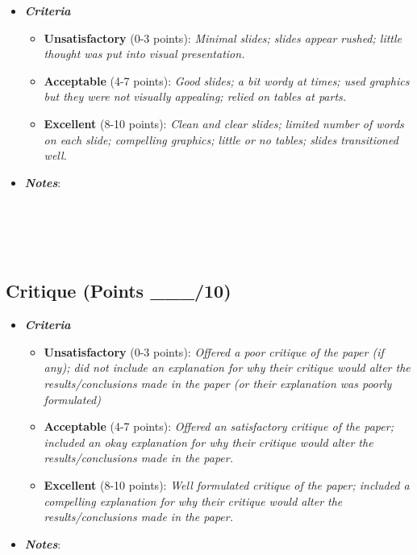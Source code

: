 \documentclass[
]{article}
\providecommand{\tightlist}{%
  \setlength{\itemsep}{0pt}\setlength{\parskip}{0pt}}
\begin{document}
\begin{itemize}
\tightlist
\item
  \textbf{\emph{Criteria}}

  \begin{itemize}
  \tightlist
  \item
    \textbf{Unsatisfactory} (0-3 points): \emph{Minimal slides; slides
    appear rushed; little thought was put into visual presentation.}
  \item
    \textbf{Acceptable} (4-7 points): \emph{Good slides; a bit wordy at
    times; used graphics but they were not visually appealing; relied on
    tables at parts.}
  \item
    \textbf{Excellent} (8-10 points): \emph{Clean and clear slides;
    limited number of words on each slide; compelling graphics; little
    or no tables; slides transitioned well.}
  \end{itemize}
\item
  \textbf{\emph{Notes}}:
\end{itemize}

\begin{verbatim}
  
  
  
  
\end{verbatim}

\pagebreak

\hypertarget{critique-points-___10}{%
\subsection{Critique (Points \_\_\_/10)}\label{critique-points-___10}}

\begin{itemize}
\tightlist
\item
  \textbf{\emph{Criteria}}

  \begin{itemize}
  \tightlist
  \item
    \textbf{Unsatisfactory} (0-3 points): \emph{Offered a poor critique
    of the paper (if any); did not include an explanation for why their
    critique would alter the results/conclusions made in the paper (or
    their explanation was poorly formulated)}
  \item
    \textbf{Acceptable} (4-7 points): \emph{Offered an satisfactory
    critique of the paper; included an okay explanation for why their
    critique would alter the results/conclusions made in the paper.}
  \item
    \textbf{Excellent} (8-10 points): \emph{Well formulated critique of
    the paper; included a compelling explanation for why their critique
    would alter the results/conclusions made in the paper.}
  \end{itemize}
\item
  \textbf{\emph{Notes}}:
\end{itemize}
\end{document}
